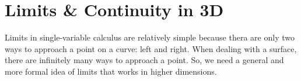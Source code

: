 \section{Limits \& Continuity in 3D}
\noindent
Limits in single-variable calculus are relatively simple because thera are only two ways to approach a point on a curve: left and right. When dealing with a surface, there are infinitely many ways to approach a point. So, we need a general and more formal idea of limits that works in higher dimensions.



